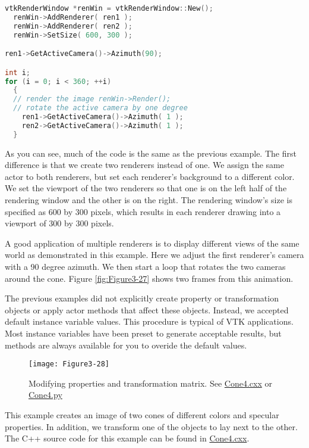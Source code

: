 \begin{description}[leftmargin=0cm,labelindent=0cm]
\begin{lstlisting}[language=C++, caption={Cone3.cxx}]
vtkRenderWindow *renWin = vtkRenderWindow::New();
  renWin->AddRenderer( ren1 );
  renWin->AddRenderer( ren2 );
  renWin->SetSize( 600, 300 );

ren1->GetActiveCamera()->Azimuth(90);

int i;
for (i = 0; i < 360; ++i)
  {
  // render the image renWin->Render();
  // rotate the active camera by one degree
    ren1->GetActiveCamera()->Azimuth( 1 );
    ren2->GetActiveCamera()->Azimuth( 1 );
  }
\end{lstlisting}

As you can see, much of the code is the same as the previous example. The first difference is that we create two renderers instead of one. We assign the same actor to both renderers, but set each renderer's background to a different color. We set the viewport of the two renderers so that one is on the left half of the rendering window and the other is on the right. The rendering window's size is specified as 600 by 300 pixels, which results in each renderer drawing into a viewport of 300 by 300 pixels.

A good application of multiple renderers is to display different views of the same world as demonstrated in this example. Here we adjust the first renderer's camera with a 90 degree azimuth. We then start a loop that rotates the two cameras around the cone. Figure \ref{fig:Figure3-27} shows two frames from this animation.

\item[Properties and Transformations.]

The previous examples did not explicitly create property or transformation objects or apply actor methods that affect these objects. Instead, we accepted default instance variable values. This procedure is typical of VTK applications. Most instance variables have been preset to generate acceptable results, but methods are always available for you to overide the default values. 

\begin{figure}[!htb]
  \centering
  \texttt{[image: Figure3-28]}\\
  \caption{Modifying properties and transformation matrix. See  \href{https://lorensen.github.io/VTKExamples/site/Cxx/Rendering/Cone4/}{Cone4.cxx} or \href{https://lorensen.github.io/VTKExamples/site/Python/Rendering/Cone4/}{Cone4.py}}\label{fig:Figure3-28}
\end{figure}

This example creates an image of two cones of different colors and specular properties. In addition, we transform one of the objects to lay next to the other. The C++ source code for this example can be found in \href{https://lorensen.github.io/VTKExamples/site/Cxx/Rendering/Cone4/}{Cone4.cxx}.


\end{description}
